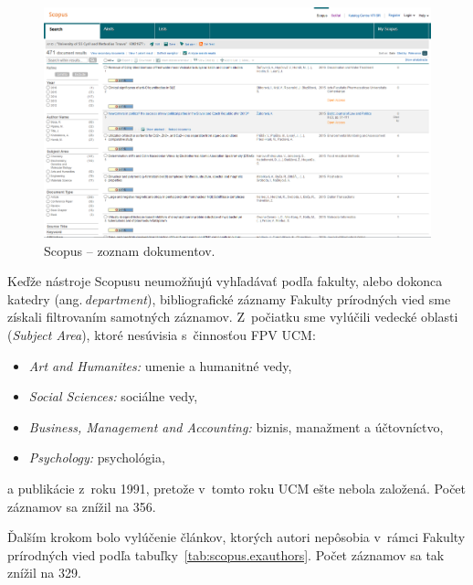 \begin{figure}
  \centering
  \includegraphics[width=\textwidth]{obr/scopus04-cut.jpg}
  \caption{Scopus -- zoznam dokumentov.}
  \label{fig:scopus.documentlist}
\end{figure}

Keďže nástroje Scopusu neumožňujú vyhľadávať podľa fakulty, alebo dokonca
katedry (ang.\,\emph{department}), bibliografické záznamy Fakulty prírodných
vied sme získali filtrovaním samotných záznamov.  Z~počiatku sme vylúčili
vedecké oblasti (\emph{Subject Area}), ktoré nesúvisia s~činnosťou FPV UCM:
\begin{itemize}
\item \emph{Art and Humanites:} umenie a humanitné vedy,
\item \emph{Social Sciences:} sociálne vedy,
\item \emph{Business, Management and Accounting:} biznis, manažment a
  účtovníctvo,
\item \emph{Psychology:} psychológia,
\end{itemize}
a publikácie z~roku 1991, pretože v~tomto roku UCM ešte nebola založená.  Počet
záznamov sa znížil na 356.

Ďalším krokom bolo vylúčenie článkov, ktorých autori nepôsobia v~rámci Fakulty
prírodných vied podľa tabuľky~\ref{tab:scopus.exauthors}.  Počet záznamov sa tak
znížil na 329.

